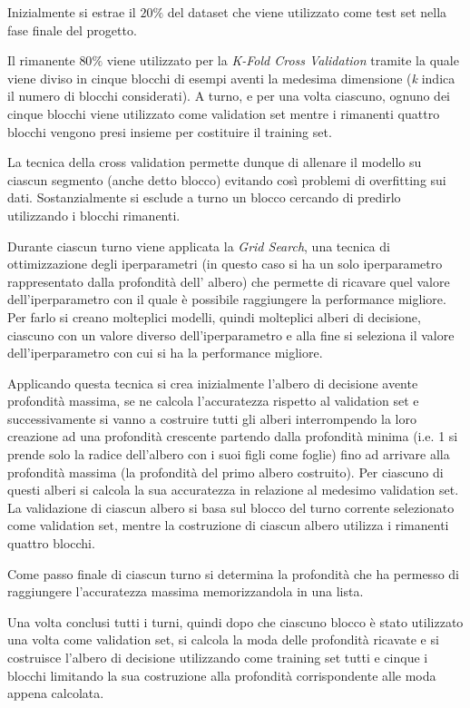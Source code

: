 \documentclass[a4paper, 10pt]{article}
\begin{document}
Inizialmente si estrae il $20\%$ del dataset che viene utilizzato come test set nella fase finale del progetto.

Il rimanente $80\%$ viene utilizzato per la \textit{K-Fold Cross Validation} tramite la quale viene diviso in cinque blocchi di esempi aventi la medesima dimensione (\textit{k} indica il numero di blocchi considerati). A turno, e per una volta ciascuno, ognuno dei cinque blocchi viene utilizzato come validation set mentre i rimanenti quattro blocchi vengono presi insieme per costituire il training set.

La tecnica della cross validation permette dunque di allenare il modello su ciascun segmento (anche detto blocco) evitando così problemi di overfitting sui dati. Sostanzialmente si esclude a turno un blocco cercando di predirlo utilizzando i blocchi rimanenti.

Durante ciascun turno viene applicata la \textit{Grid Search}, una tecnica di ottimizzazione degli iperparametri (in questo caso si ha un solo iperparametro rappresentato dalla profondità dell' albero) che permette di ricavare quel valore dell'iperparametro con il quale è possibile raggiungere la performance migliore. Per farlo si creano molteplici modelli, quindi molteplici alberi di decisione, ciascuno con un valore diverso dell'iperparametro e alla fine si seleziona il valore dell'iperparametro con cui si ha la performance migliore.

Applicando questa tecnica si crea inizialmente l'albero di decisione avente profondità massima, se ne calcola l'accuratezza rispetto al validation set e successivamente si vanno a costruire tutti gli alberi interrompendo la loro creazione ad una profondità crescente partendo dalla profondità minima (i.e. 1 si prende solo la radice dell'albero con i suoi figli come foglie) fino ad arrivare alla profondità massima (la profondità del primo albero costruito). Per ciascuno di questi alberi si calcola la sua accuratezza in relazione al medesimo validation set. La validazione di ciascun albero si basa sul blocco del turno corrente selezionato come validation set, mentre la costruzione di ciascun albero utilizza i rimanenti quattro blocchi.

Come passo finale di ciascun turno si determina la profondità che ha permesso di raggiungere l'accuratezza massima memorizzandola in una lista.

Una volta conclusi tutti i turni, quindi dopo che ciascuno blocco è stato utilizzato una volta come validation set, si calcola la moda delle profondità ricavate e si costruisce l'albero di decisione utilizzando come training set tutti e cinque i blocchi limitando la sua costruzione alla profondità corrispondente alle moda appena calcolata.
\end{document}
